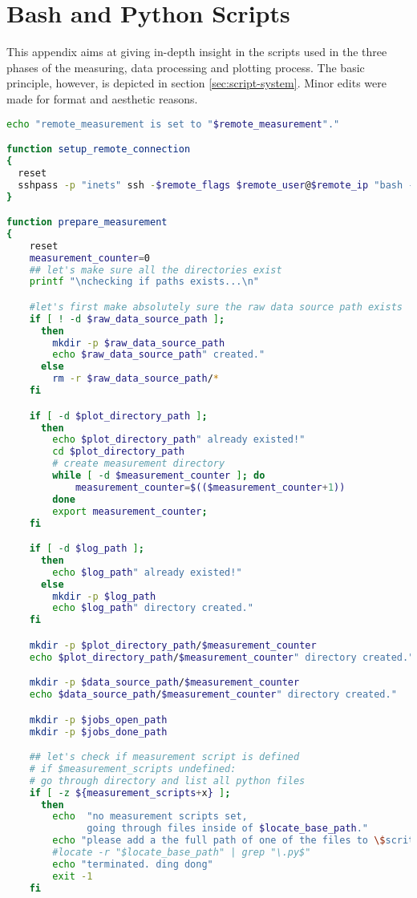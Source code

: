 \chapter{Bash and Python Scripts}

This appendix aims at giving in-depth insight in the scripts used in the three phases of the measuring, data processing and plotting process. The basic principle, however, is depicted in section \ref{sec:script-system}. Minor edits were made for format and aesthetic reasons.

\begin{lstlisting}[language=Bash,caption=measure.sh]
echo "remote_measurement is set to "$remote_measurement"."

function setup_remote_connection
{
  reset
  sshpass -p "inets" ssh -$remote_flags $remote_user@$remote_ip "bash -s" < remote_measurement_$link.sh
}

function prepare_measurement
{
    reset
    measurement_counter=0
    ## let's make sure all the directories exist
    printf "\nchecking if paths exists...\n"

    #let's first make absolutely sure the raw data source path exists
    if [ ! -d $raw_data_source_path ];
      then
        mkdir -p $raw_data_source_path
        echo $raw_data_source_path" created."
      else
        rm -r $raw_data_source_path/*
    fi

    if [ -d $plot_directory_path ];
      then
        echo $plot_directory_path" already existed!"
        cd $plot_directory_path
        # create measurement directory
        while [ -d $measurement_counter ]; do
            measurement_counter=$(($measurement_counter+1))
        done
        export measurement_counter;
    fi

    if [ -d $log_path ];
      then
        echo $log_path" already existed!"
      else
        mkdir -p $log_path
        echo $log_path" directory created."
    fi

    mkdir -p $plot_directory_path/$measurement_counter
    echo $plot_directory_path/$measurement_counter" directory created."

    mkdir -p $data_source_path/$measurement_counter
    echo $data_source_path/$measurement_counter" directory created."

    mkdir -p $jobs_open_path
    mkdir -p $jobs_done_path

    ## let's check if measurement script is defined
    # if $measurement_scripts undefined:
    # go through directory and list all python files
    if [ -z ${measurement_scripts+x} ];
      then
        echo  "no measurement scripts set,
              going through files inside of $locate_base_path."
        echo "please add a the full path of one of the files to \$scritps."
        #locate -r "$locate_base_path" | grep "\.py$"
        echo "terminated. ding dong"
        exit -1
    fi


\end{lstlisting}
